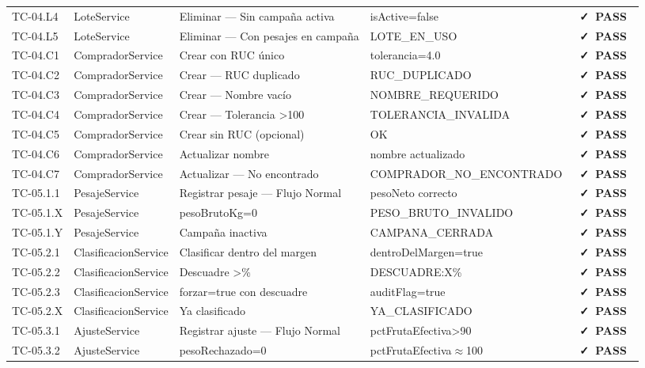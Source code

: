 \documentclass[12pt, a4paper]{article}
\newcommand{\badgePass}{\colorbox{CSuccessBg}{\color{CSuccess}\small\bfseries\ \faCheck\ PASS\ }}
\begin{document}
\begin{longtable}{>{\ttfamily}p{2.1cm} p{2.5cm} p{5.0cm} p{2.5cm} >{\centering\arraybackslash}p{0.9cm}}
  TC-04.L4 & LoteService & Eliminar --- Sin campaña activa & isActive=false & \badgePass \\
  TC-04.L5 & LoteService & Eliminar --- Con pesajes en campaña & LOTE\_EN\_USO & \badgePass \\
  \rowcolor{CBg}
  TC-04.C1 & CompradorService & Crear con RUC único & tolerancia=4.0 & \badgePass \\
  TC-04.C2 & CompradorService & Crear --- RUC duplicado & RUC\_DUPLICADO & \badgePass \\
  \rowcolor{CBg}
  TC-04.C3 & CompradorService & Crear --- Nombre vacío & NOMBRE\_REQUERIDO & \badgePass \\
  TC-04.C4 & CompradorService & Crear --- Tolerancia \textgreater 100 & TOLERANCIA\_INVALIDA & \badgePass \\
  \rowcolor{CBg}
  TC-04.C5 & CompradorService & Crear sin RUC (opcional) & OK & \badgePass \\
  TC-04.C6 & CompradorService & Actualizar nombre & nombre actualizado & \badgePass \\
  \rowcolor{CBg}
  TC-04.C7 & CompradorService & Actualizar --- No encontrado & COMPRADOR\_NO\_ENCONTRADO & \badgePass \\
  \midrule
  TC-05.1.1 & PesajeService & Registrar pesaje --- Flujo Normal & pesoNeto correcto & \badgePass \\
  \rowcolor{CBg}
  TC-05.1.X & PesajeService & pesoBrutoKg=0 & PESO\_BRUTO\_INVALIDO & \badgePass \\
  TC-05.1.Y & PesajeService & Campaña inactiva & CAMPANA\_CERRADA & \badgePass \\
  \rowcolor{CBg}
  TC-05.2.1 & ClasificacionService & Clasificar dentro del margen & dentroDelMargen=true & \badgePass \\
  TC-05.2.2 & ClasificacionService & Descuadre \textgreater \textpm 4\% & DESCUADRE:X\% & \badgePass \\
  \rowcolor{CBg}
  TC-05.2.3 & ClasificacionService & forzar=true con descuadre & auditFlag=true & \badgePass \\
  TC-05.2.X & ClasificacionService & Ya clasificado & YA\_CLASIFICADO & \badgePass \\
  \midrule
  TC-05.3.1 & AjusteService & Registrar ajuste --- Flujo Normal & pctFrutaEfectiva\textgreater 90 & \badgePass \\
  \rowcolor{CBg}
  TC-05.3.2 & AjusteService & pesoRechazado=0 & pctFrutaEfectiva$\approx$100 & \badgePass \\

\end{longtable}
\end{document}
